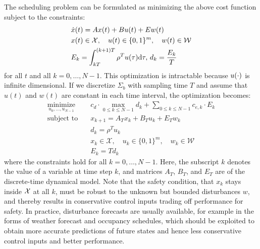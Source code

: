 The %
scheduling problem can be formulated as minimizing the above cost function subject to the constraints:
\begin{align*}
  & \dot{x} (t) = Ax (t) + Bu (t) + Ew (t)\\%
  & x (t) \in \mathcal{X}, \quad u(t) \in \{0,1\}^{m}, \quad w (t) \in \mathcal{W}\\%
  & E_k = \int_{kT}^{(k + 1) T} \rho^T u (\tau) \mathd \tau, \, d_k = \frac{E_k}{T}%
\end{align*}
 for all $t$ and all $k = 0, \ldots, N - 1$.
This optimization is intractable because $u (\cdot)$ is infinite
dimensional.
If we discretize $\Sigma_b$ with sampling time $T$ and assume that $u (t)$ and $w (t)$ are constant in each time interval, the optimization becomes:
\begin{align}
  \operatorname*{minimize}_{u_{0}, \ldots, u_{N - 1}} \quad & c_d \cdot \max_{0
  \leqslant k \leqslant N - 1} d_k + \textstyle\sum_{0 \leqslant k \leqslant N - 1}
  c_{e, k} \cdot E_k  \label{eq:MILP}\\
  \text{subject to} \quad & x_{k+1} = A_{T} x_{k} + B_{T} u_{k} + E_{T} w_{k}  \nonumber\\
  & d_k = \rho^T u_{k} \nonumber\\
  & x_{k} \in \mathcal{X}, \quad u_{k} \in \{0,1\}^{m}, \quad w_{k} \in \mathcal{W} \nonumber\\
  & E_k = T d_k \nonumber
\end{align}
where the constraints hold for all $k = 0, \ldots, N - 1$.
Here, the subscript $k$ denotes the value of a variable at time step $k$, and matrices $A_{T}$, $B_{T}$, and $E_{T}$ are of the discrete-time dynamical model.
Note that the safety condition, that $x_k$ stays inside $\mathcal{X}$ at all $k$, must be robust to the unknown but bounded disturbances $w$, and thereby results in conservative control inputs trading off performance for safety.
In practice, disturbance forecasts are usually available, for example in the forms of weather forecast and occupancy schedules, which should be exploited to obtain more accurate predictions of future states and hence less conservative control inputs and better performance.
